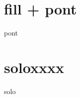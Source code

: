 \xxxstruct

\newpage

\begin{multicols}{2}
	\xxxlyrics
\end{multicols}


\newpage
\section*{fill + pont}
{pont}
\section*{soloxxxx}
{solo}
\newpage
